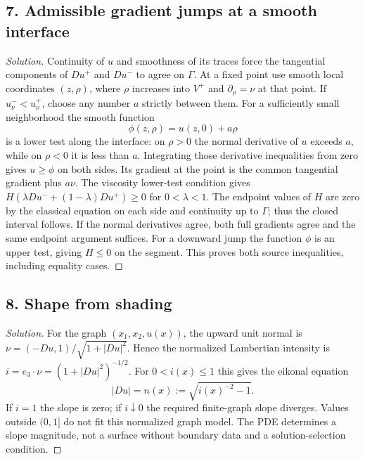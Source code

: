 \subsection*{7. Admissible gradient jumps at a smooth interface}
\begin{proof}[Solution]
Continuity of $u$ and smoothness of its traces force the tangential
components of $Du^+$ and $Du^-$ to agree on $\Gamma$.
At a fixed point use smooth local coordinates $(z,\rho)$, where
$\rho$ increases into $V^+$ and $\partial_\rho=\nu$ at that point.
If $u_\nu^-<u_\nu^+$, choose any number $a$ strictly between them.
For a sufficiently small neighborhood the smooth function
\[
 \phi(z,\rho)=u(z,0)+a\rho
\]
is a lower test along the interface: on $\rho>0$ the normal derivative
of $u$ exceeds $a$, while on $\rho<0$ it is less than $a$.
Integrating those derivative inequalities from zero gives $u\geq\phi$
on both sides. Its gradient at the point is the common tangential
gradient plus $a\nu$. The viscosity lower-test condition gives
$H(\lambda Du^-+(1-\lambda)Du^+)\geq0$ for $0<\lambda<1$.
The endpoint values of $H$ are zero by the classical equation on each
side and continuity up to $\Gamma$; thus the closed interval follows.
If the normal derivatives agree, both full gradients agree and the same
endpoint argument suffices. For a downward jump the function $\phi$
is an upper test, giving $H\leq0$ on the segment. This proves both
source inequalities, including equality cases.
\end{proof}
\Needspace{42mm}

\subsection*{8. Shape from shading}
\begin{proof}[Solution]
For the graph $(x_1,x_2,u(x))$, the upward unit normal is
$\nu=(-Du,1)/\sqrt{1+|Du|^2}$. Hence the normalized Lambertian
intensity is $i=e_3\cdot\nu=(1+|Du|^2)^{-1/2}$.
For $0<i(x)\leq1$ this gives the eikonal equation
\[
 |Du|=n(x):=\sqrt{i(x)^{-2}-1}.
\]
If $i=1$ the slope is zero; if $i\downarrow0$ the required finite-graph
slope diverges. Values outside $(0,1]$ do not fit this normalized graph
model. The PDE determines a slope magnitude, not a surface without
boundary data and a solution-selection condition.
\end{proof}

